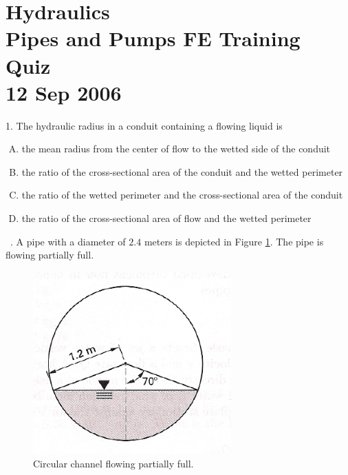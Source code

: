 \documentclass[12 pt]{article}
\begin{document}
\begingroup
\centering
\section*{\small{Hydraulics\\ Pipes and Pumps FE Training Quiz\\  12 Sep 2006} }

\endgroup
1.  The hydraulic radius in a conduit containing a flowing liquid is
\begin{enumerate} [(A)]
\item	the mean radius from the center of flow to the wetted side of the conduit
\item	the ratio of the cross-sectional area of the conduit and the wetted perimeter
\item	the ratio of the wetted perimeter and the cross-sectional area of the conduit
\item	the ratio of the cross-sectional area of flow and the wetted perimeter
\end{enumerate}
~. A pipe with a diameter of $2.4$ meters is depicted in Figure \ref{fig:CircularSewer}.   The pipe is flowing partially full.

\begin{figure}[h!] %
\centering
   \includegraphics[width=3in]{CircularSewer.png}
   \caption{Circular channel flowing partially full.}
   \label{fig:CircularSewer} 
\end{figure}
\end{document}

